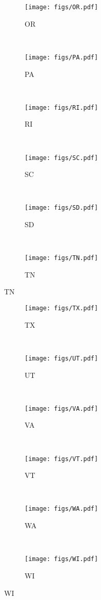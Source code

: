 \begin{figure}[tp]
	 \centering
	 \begin{subfigure}[b]{0.49\textwidth}
	 \centering
	 \texttt{[image: figs/OR.pdf]}
	 \caption{ OR }
	 \end{subfigure}
	 ~
	 \begin{subfigure}[b]{0.49\textwidth}
	 \centering
	 \texttt{[image: figs/PA.pdf]}
	 \caption{ PA }
	 \end{subfigure}
	 ~
	 \begin{subfigure}[b]{0.49\textwidth}
	 \centering
	 \texttt{[image: figs/RI.pdf]}
	 \caption{ RI }
	 \end{subfigure}
	 ~
	 \begin{subfigure}[b]{0.49\textwidth}
	 \centering
	 \texttt{[image: figs/SC.pdf]}
	 \caption{ SC }
	 \end{subfigure}
	 ~
	 \begin{subfigure}[b]{0.49\textwidth}
	 \centering
	 \texttt{[image: figs/SD.pdf]}
	 \caption{ SD }
	 \end{subfigure}
	 ~
	 \begin{subfigure}[b]{0.49\textwidth}
	 \centering
	 \texttt{[image: figs/TN.pdf]}
	 \caption{ TN }
	 \end{subfigure}
\end{figure}
\begin{figure}[tp]
	 \centering
	 \begin{subfigure}[b]{0.49\textwidth}
	 \centering
	 \texttt{[image: figs/TX.pdf]}
	 \caption{ TX }
	 \end{subfigure}
	 ~
	 \begin{subfigure}[b]{0.49\textwidth}
	 \centering
	 \texttt{[image: figs/UT.pdf]}
	 \caption{ UT }
	 \end{subfigure}
	 ~
	 \begin{subfigure}[b]{0.49\textwidth}
	 \centering
	 \texttt{[image: figs/VA.pdf]}
	 \caption{ VA }
	 \end{subfigure}
	 ~
	 \begin{subfigure}[b]{0.49\textwidth}
	 \centering
	 \texttt{[image: figs/VT.pdf]}
	 \caption{ VT }
	 \end{subfigure}
	 ~
	 \begin{subfigure}[b]{0.49\textwidth}
	 \centering
	 \texttt{[image: figs/WA.pdf]}
	 \caption{ WA }
	 \end{subfigure}
	 ~
	 \begin{subfigure}[b]{0.49\textwidth}
	 \centering
	 \texttt{[image: figs/WI.pdf]}
	 \caption{ WI }
	 \end{subfigure}
\end{figure}

